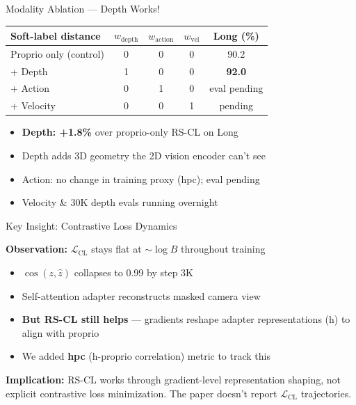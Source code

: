 \documentclass[10pt]{beamer}
\begin{document}
\begin{frame}{Modality Ablation — Depth Works!}

\begin{table}
  \centering
  \begin{tabular}{lcccc}
    \toprule
    \textbf{Soft-label distance} & $w_\text{depth}$ & $w_\text{action}$ & $w_\text{vel}$ & \textbf{Long (\%)} \\
    \midrule
    Proprio only (control) & 0 & 0 & 0 & 90.2 \\
    \alert{+ Depth}        & 1 & 0 & 0 & \alert{\textbf{92.0}} \\
    + Action               & 0 & 1 & 0 & eval pending \\
    + Velocity             & 0 & 0 & 1 & pending \\
    \bottomrule
  \end{tabular}
\end{table}

\vspace{0.5em}

\begin{itemize}
  \item \textbf{Depth: +1.8\%} over proprio-only RS-CL on Long
  \item Depth adds 3D geometry the 2D vision encoder can't see
  \item Action: no change in training proxy (hpc); eval pending
  \item Velocity \& 30K depth evals running overnight
\end{itemize}

\end{frame}

\begin{frame}{Key Insight: Contrastive Loss Dynamics}

\textbf{Observation:} $\mathcal{L}_\text{CL}$ stays flat at $\sim\!\log B$ throughout training

\vspace{0.5em}

\begin{itemize}
  \item $\cos(z, \hat{z})$ collapses to 0.99 by step 3K
  \item Self-attention adapter reconstructs masked camera view
  \item \textbf{But RS-CL still helps} — gradients reshape adapter representations (h) to align with proprio
  \item We added \textbf{hpc} (h-proprio correlation) metric to track this
\end{itemize}

\vspace{0.8em}

\textbf{Implication:} RS-CL works through gradient-level representation shaping, not explicit contrastive loss minimization. The paper doesn't report $\mathcal{L}_\text{CL}$ trajectories.

\end{frame}
\end{document}
